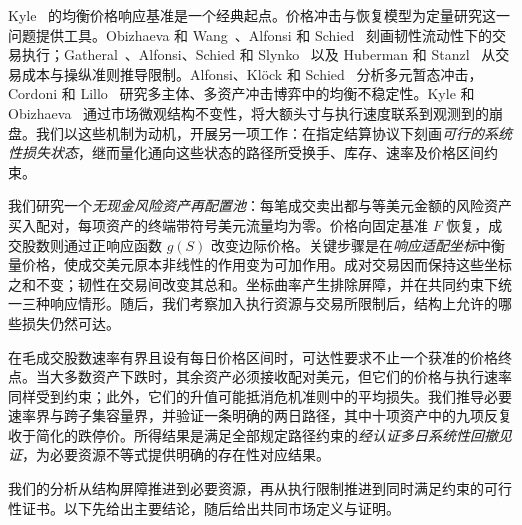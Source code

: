 \documentclass[11pt]{article}
\numberwithin{equation}{section}
\theoremstyle{definition}
\theoremstyle{remark}
\begin{document}
Kyle~\citep{Kyle1985} 的均衡价格响应基准是一个经典起点。价格冲击与恢复模型为定量研究这一问题提供工具。Obizhaeva 和 Wang~\citep{ObizhaevaWang2013}、Alfonsi 和 Schied~\citep{AlfonsiSchied2010} 刻画韧性流动性下的交易执行；Gatheral~\citep{Gatheral2010}、Alfonsi、Schied 和 Slynko~\citep{AlfonsiSchiedSlynko2012} 以及 Huberman 和 Stanzl~\citep{HubermanStanzl2004} 从交易成本与操纵准则推导限制。Alfonsi、Kl\"ock 和 Schied~\citep{AlfonsiKlockSchied2016} 分析多元暂态冲击，Cordoni 和 Lillo~\citep{CordoniLillo2024} 研究多主体、多资产冲击博弈中的均衡不稳定性。Kyle 和 Obizhaeva~\citep{KyleObizhaeva2023} 通过市场微观结构不变性，将大额头寸与执行速度联系到观测到的崩盘。我们以这些机制为动机，开展另一项工作：在指定结算协议下刻画\emph{可行的系统性损失状态}，继而量化通向这些状态的路径所受换手、库存、速率及价格区间约束。

我们研究一个\emph{无现金风险资产再配置池}：每笔成交卖出都与等美元金额的风险资产买入配对，每项资产的终端带符号美元流量均为零。价格向固定基准 $F$ 恢复，成交股数则通过正响应函数 $g(S)$ 改变边际价格。关键步骤是在\emph{响应适配坐标}中衡量价格，使成交美元原本非线性的作用变为可加作用。成对交易因而保持这些坐标之和不变；韧性在交易间改变其总和。坐标曲率产生排除屏障，并在共同约束下统一三种响应情形。随后，我们考察加入执行资源与交易所限制后，结构上允许的哪些损失仍然可达。

在毛成交股数速率有界且设有每日价格区间时，可达性要求不止一个获准的价格终点。当大多数资产下跌时，其余资产必须接收配对美元，但它们的价格与执行速率同样受到约束；此外，它们的升值可能抵消危机准则中的平均损失。我们推导必要速率界与跨子集容量界，并验证一条明确的两日路径，其中十项资产中的九项反复收于简化的跌停价。所得结果是满足全部规定路径约束的\emph{经认证多日系统性回撤见证}，为必要资源不等式提供明确的存在性对应结果。

我们的分析从结构屏障推进到必要资源，再从执行限制推进到同时满足约束的可行性证书。以下先给出主要结论，随后给出共同市场定义与证明。
\end{document}
